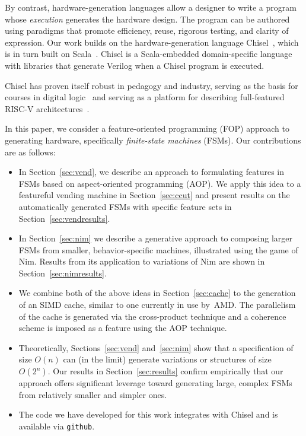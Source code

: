 \documentclass[conference]{IEEEtran}
\begin{document}
By contrast, hardware-generation languages allow a designer to write a program whose \emph{execution} generates the hardware design. The program can be authored using para\-digms that promote efficiency, reuse, rigorous testing, and clarity of expression. Our work builds on the hardware-generation language Chisel~\cite{chisel:book}, which is in turn built on Scala~\cite{scala-overview-tech-report}. Chisel is a Scala-embedded domain-specific language with libraries that generate Verilog when a Chisel program is executed.

Chisel has proven itself robust in pedagogy and industry, serving as the basis for courses in digital logic~\cite{vlsicourse} and serving as a platform for describing full-featured RISC-V architectures~\cite{chisel:riscv}.  

In this paper, we consider a feature-oriented programming (FOP) approach to generating hardware, specifically \emph{finite-state machines} (FSMs).   Our contributions are as follows:
\begin{itemize}
    \item In Section~\ref{sec:vend}, we describe an approach to formulating features in FSMs based on aspect-oriented programming (AOP).  We apply this idea to a featureful vending machine in Section~\ref{sec:ccut} and present results on the automatically generated FSMs with specific feature sets in Section~\ref{sec:vendresults}.
    \item In Section~\ref{sec:nim} we describe a generative approach to composing larger FSMs from smaller, behavior-specific machines, illustrated using the game of Nim.  Results from its application to variations of Nim are shown in Section~\ref{sec:nimresults}.
    \item We combine both of the above ideas in Section~\ref{sec:cache} to the generation of an SIMD cache, similar to one currently in use by~AMD.  The parallelism of the cache is generated via the cross-product technique and a coherence scheme is imposed as a feature using the AOP technique.
    \item Theoretically, Sections~\ref{sec:vend} and~\ref{sec:nim} show that a specification of size $O(n)$ can (in the limit) generate variations or structures of size~$O(2^{n})$.  Our results in Section~\ref{sec:results} confirm empirically that our approach offers significant leverage toward generating large, complex FSMs from relatively smaller and simpler ones. 
    \item The code we have developed for this work integrates with Chisel and is available via \texttt{github}.
\end{itemize}
\end{document}
